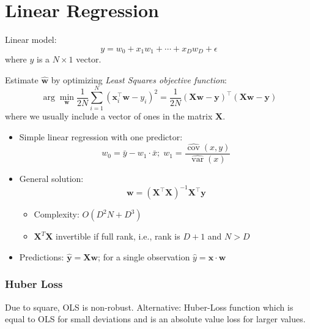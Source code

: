 \documentclass[11pt, %
	oneside, %
	english, %
	onehalfspacing, %
	parskip, %
	]{article} %
\theoremstyle{definition}
\begin{document}
\section{Linear Regression}

Linear model:
\begin{equation*}
	y=w_0+x_1 w_1+\cdots+x_D w_D+\epsilon
\end{equation*}
where $y$ is a $N \times 1$ vector.

Estimate $\hat{\mathbf{w}}$ by optimizing \emph{Least Squares objective function}:
\begin{equation*}
	\arg \min_\mathbf{w}  \frac{1}{2 N} \sum_{i=1}^N\left(\mathbf{x}_i^{\top} \mathbf{w}-y_i\right)^2=\frac{1}{2 N}(\mathbf{X} \mathbf{w}-\mathbf{y})^{\top}(\mathbf{X} \mathbf{w}-\mathbf{y})
\end{equation*}
where we usually include a vector of ones in the matrix $\mathbf{X}$.

\begin{itemize}
	\item Simple linear regression with one predictor:
	\begin{equation*}
		w_0=\bar{y}-w_1 \cdot \bar{x}; \; w_1=\frac{\widehat{\operatorname{cov}}(x, y)}{\widehat{\operatorname{var}}(x)}
	\end{equation*}

	\item General solution:
	\begin{equation*}
		\mathbf{w}=\left(\mathbf{X}^{\top} \mathbf{X}\right)^{-1} \mathbf{X}^{\top} \mathbf{y}
	\end{equation*}
	\begin{itemize}
		\item Complexity: $O(D^2N + D^3)$
		\item $\mathbf{X}^T \mathbf{X}$ invertible if full rank, i.e., rank is $D+1$ and $N > D$
	\end{itemize}
	\item Predictions: $\hat{\mathbf{y}} = \mathbf{X} {\mathbf{w}}$; for a single observation $\hat{y} = \mathbf{x} \cdot \mathbf{w}$
\end{itemize}


\subsubsection*{Huber Loss}

Due to square, OLS is non-robust. Alternative: Huber-Loss function which is equal to OLS for small deviations and is an absolute value loss for larger values.
\end{document}
